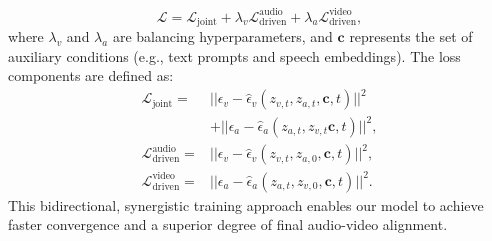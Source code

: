 \begin{equation}
\label{eq:total_loss}
\mathcal{L} = \mathcal{L}_{\text{joint}} + \lambda_v \mathcal{L}_{\text{driven}}^\text{audio} + \lambda_a \mathcal{L}_{\text{driven}}^\text{video},
\end{equation}
where $\lambda_v$ and $\lambda_a$ are balancing hyperparameters, and $\mathbf{c}$ represents the set of auxiliary conditions (e.g., text prompts and speech embeddings). The loss components are defined as:
\begin{equation}
\begin{aligned}
    \mathcal{L}_{\text{joint}} =& ||\epsilon_v - \hat{\epsilon}_v(z_{v,t}, z_{a,t},\mathbf{c}, t)||^2 \\&+ ||\epsilon_a - \hat{\epsilon}_a(z_{a,t}, z_{v,t}\mathbf{c}, t)||^2, \\
    \mathcal{L}_{\text{driven}}^\text{audio} =& ||\epsilon_v - \hat{\epsilon}_v(z_{v,t}, z_{a,0},\mathbf{c}, t)||^2, \\
    \mathcal{L}_{\text{driven}}^\text{video} =& ||\epsilon_a - \hat{\epsilon}_a(z_{a,t}, z_{v,0}, \mathbf{c}, t)||^2.
\end{aligned}
\end{equation}
This bidirectional, synergistic training approach enables our model to achieve faster convergence and a superior degree of final audio-video alignment.



